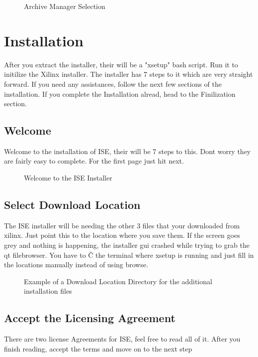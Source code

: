 \documentclass[letter]{article}
\begin{document}
\begin{figure}[!htbp]
  \centering
  \caption{Archive Manager Selection}
\end{figure}


\section{Installation}
After you extract the installer, their will be a "xsetup" bash script. Run it to initilize the Xilinx installer. The installer has 7 steps to it which are very straight forward. If you need any assistances, follow the next few sections of the installation. If you complete the Installation alread, head to the Finilization section.

\subsection{Welcome}
Welcome to the installation of ISE, their will be 7 steps to this. Dont worry they are fairly easy to complete. For the first page just hit next.

\begin{figure}[!htbp]
  \centering
  \caption{Welcome to the ISE Installer}
\end{figure}

\subsection{Select Download Location}
The ISE installer will be needing the other 3 files that your downloaded from xilinx. Just point this to the location where you save them. If the screen goes grey and nothing is happening, the installer gui crashed while trying to grab the qt filebrowser. You have to \^C the terminal where xsetup is running and just fill in the locations manually instead of using browse.

\begin{figure}[!htbp]
  \centering
  \caption{Example of a Download Location Directory for the additional installation files}
\end{figure}

\subsection{Accept the Licensing Agreement}
There are two license Agreements for ISE, feel free to read all of it. After you finish reading, accept the terms and move on to the next step
\end{document}
